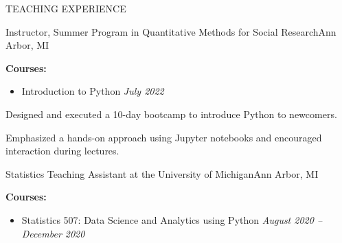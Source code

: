 \begin{rSection}{TEACHING EXPERIENCE} 
%
\begin{rSubsection}{Instructor, Summer Program in Quantitative Methods for Social Research}{Ann Arbor, MI}{}{}
\item \textbf{Courses:}
%
    \begin{itemize}[itemsep=-0.4em]
        \vspace*{-0.5em}
        \item Introduction to Python \hfill \textit{July 2022}
    \end{itemize}

\item Designed and executed a 10-day bootcamp to introduce Python to newcomers. 

\item Emphasized a hands-on approach using Jupyter notebooks and encouraged interaction during lectures.

\end{rSubsection} 
%
\begin{rSubsection}{Statistics Teaching Assistant at the University of Michigan}{Ann Arbor, MI}{}{}
\item \textbf{Courses:}
%
    \begin{itemize}[itemsep=-0.4em]
        \vspace*{-0.5em}
        \item Statistics 507: Data Science and Analytics using Python \hfill \textit{August 2020 -- December 2020}
    \end{itemize}


\end{rSubsection}
\end{rSection}
